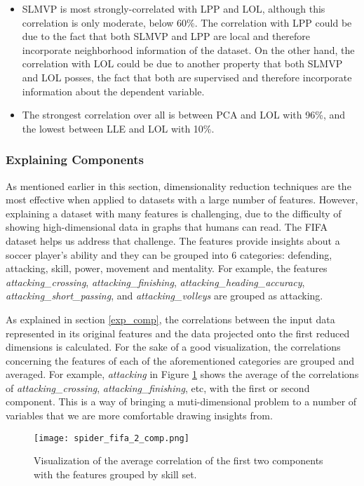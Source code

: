 \begin{itemize}
    \item SLMVP is most strongly-correlated with LPP and LOL, although this correlation is only moderate, below 60\%. The correlation with LPP could be due to the fact that both SLMVP and LPP are local and therefore incorporate neighborhood information of the dataset. On the other hand, the correlation with LOL could be due to another property that both SLMVP and LOL posses, the fact that both are supervised and therefore incorporate information about the dependent variable.
    \item The strongest correlation over all is between PCA and LOL with 96\%, and the lowest between LLE and LOL with 10\%.
\end{itemize}

\subsubsection{Explaining Components}

As mentioned earlier in this section, dimensionality reduction techniques are the most effective when applied to datasets with a large number of features. However, explaining a dataset with many features is challenging, due to the difficulty of showing high-dimensional data in graphs that humans can read. The FIFA dataset helps us address that challenge. The features provide insights about a soccer player's ability and they can be grouped into 6 categories: defending, attacking, skill, power, movement and mentality. For example, the features \textit{attacking\_crossing}, \textit{attacking\_finishing}, \textit{attacking\_heading\_accuracy}, \textit{attacking\_short\_passing}, and \textit{attacking\_volleys} are grouped as attacking.

As explained in section \ref{exp_comp}, the correlations between the input data represented in its original features and the data projected onto the first reduced dimensions is calculated. For the sake of a good visualization, the correlations concerning the features of each of the aforementioned categories are grouped and averaged. For example, \textit{attacking} in Figure \ref{fig:spider_fifa} shows the average of the correlations of \textit{attacking\_crossing}, \textit{attacking\_finishing}, etc, with the first or second component. This is a way of bringing a muti-dimensional problem to a number of variables that we are more comfortable drawing insights from.

\begin{figure}[!ht]
    \centering
    \texttt{[image: spider\_fifa\_2\_comp.png]}
    \caption{Visualization of the average correlation of the first two components with the features grouped by skill set.}
    \label{fig:spider_fifa}
\end{figure}

